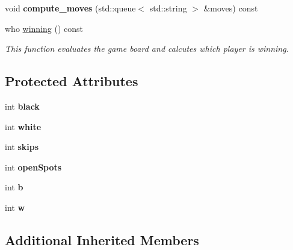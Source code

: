 \begin{DoxyCompactItemize}
\item 
\mbox{\label{classmain__savitch__14_1_1_othello_a921d4ffa277b0250f187f20b9598ebb1}} 
void {\bfseries compute\+\_\+moves} (std\+::queue$<$ std\+::string $>$ \&moves) const
\item 
who \mbox{\hyperlink{classmain__savitch__14_1_1_othello_a4ea78b18eea66c944c0a9356349e0fd4}{winning}} () const
\begin{DoxyCompactList}\small\item\em This function evaluates the game board and calcutes which player is winning. \end{DoxyCompactList}\end{DoxyCompactItemize}
\subsection*{Protected Attributes}
\begin{DoxyCompactItemize}
\item 
\mbox{\label{classmain__savitch__14_1_1_othello_a2eed818925f68d5678b78107a3298138}} 
int {\bfseries black}
\item 
\mbox{\label{classmain__savitch__14_1_1_othello_a7d5f59b1e581ed7a8145debeecf4f310}} 
int {\bfseries white}
\item 
\mbox{\label{classmain__savitch__14_1_1_othello_a85d4ce17512d8dbf85a313a27eea0644}} 
int {\bfseries skips}
\item 
\mbox{\label{classmain__savitch__14_1_1_othello_a15045e3e94c34afe08240885e230d502}} 
int {\bfseries open\+Spots}
\item 
\mbox{\label{classmain__savitch__14_1_1_othello_a98fbc46241d2f5e05ccb4b66f11535bf}} 
int {\bfseries b}
\item 
\mbox{\label{classmain__savitch__14_1_1_othello_a1b11c5fe33e30a94ed39e8cb55caf37e}} 
int {\bfseries w}
\end{DoxyCompactItemize}
\subsection*{Additional Inherited Members}



